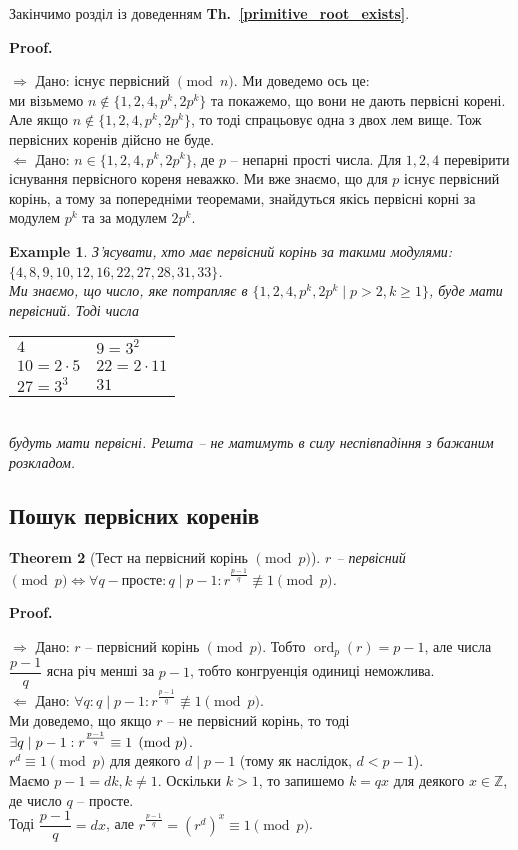 \documentclass[a4paper, 14pt]{extarticle}
\makeatletter
\theoremstyle{theoremdd}
\newtheorem{theorem}{Theorem}[subsection]
\theoremstyle{theoremdd}
\theoremstyle{theoremdd}
\theoremstyle{theoremdd}
\newtheorem{example}[theorem]{Example}
\theoremstyle{theoremdd}
\theoremstyle{theoremdd}
\theoremstyle{theoremdd}
\theoremstyle{theoremdd}
\def\qed{$\blacksquare$}
\def\rightproof{$\boxed{\Rightarrow}$ }
\def\leftproof{$\boxed{\Leftarrow}$ }
\renewenvironment{proof}[1][Proof.\\]{\par
\pushQED{\hfill \qed}%
\normalfont \topsep6\p@\@plus6\p@\relax
\trivlist
\item\relax
{\bfseries
#1\@addpunct{.}}\hspace\labelsep\ignorespaces
}{%
\popQED\endtrivlist\@endpefalse
}
\DeclareMathOperator{\ord}{ord}
\newcommand\thref[1]{\textbf{Th.~\ref{#1}}}
\makeatother
\begin{document}
Закінчимо розділ із доведенням \thref{primitive_root_exists}.

\begin{proof}
\rightproof Дано: існує первісний $\!\! \pmod n$. Ми доведемо ось це:\\
ми візьмемо $n \not\in \{1,2,4,p^k,2p^k\}$ та покажемо, що вони не дають первісні корені. Але якщо $n \not \in \{1,2,4,p^k,2p^k\}$, то тоді спрацьовує одна з двох лем вище. Тож первісних коренів дійсно не буде.
\bigskip \\
\leftproof Дано: $n \in \{1,2,4,p^k,2p^k\}$, де $p$ -- непарні прості числа. Для $1,2,4$ перевірити існування первісного кореня неважко. Ми вже знаємо, що для $p$ існує первісний корінь, а тому за попередніми теоремами, знайдуться якісь первісні корні за модулем $p^k$ та за модулем $2p^k$.
\end{proof}

\begin{example}
З'ясувати, хто має первісний корінь за такими модулями: $\{4,8,9,10,12,16,22,27,28,31,33\}$.\\
Ми знаємо, що число, яке потрапляє в $\{1,2,4,p^k,2p^k \mid p > 2, k \geq 1\}$, буде мати первісний. Тоді числа\\
\begin{tabular}{ll}
$4$ & $9 = 3^2$\\
$10 = 2 \cdot 5$ & $22 = 2 \cdot 11$\\
$27 = 3^3$ & $31$
\end{tabular}\\
будуть мати первісні. Решта -- не матимуть в силу неспівпадіння з бажаним розкладом.
\end{example}

\subsection{Пошук первісних коренів}
\begin{theorem}[Тест на первісний корінь $\!\! \pmod p$]
$r$ -- первісний $\pmod p \iff \forall q - \text{просте}: q \mid p-1: r^{\frac{p-1}{q}} \not\equiv 1 \pmod p$.
\end{theorem}

\begin{proof}
\rightproof Дано: $r$ -- первісний корінь $\pmod p$. Тобто $\ord_p (r) = p-1$, але числа $\dfrac{p-1}{q}$ ясна річ менші за $p-1$, тобто конгруенція одиниці неможлива.
\bigskip \\
\leftproof Дано: $\forall q: q \mid p-1: r^{\frac{p-1}{q}} \not\equiv 1 \pmod p$.\\
Ми доведемо, що якщо $r$ -- не первісний корінь, то тоді $\exists q \mid p-1:\\ r^{\frac{p-1}{q}} \equiv 1 \pmod p$.\\
$r^d \equiv 1 \pmod p$ для деякого $d \mid p-1$ (тому як наслідок, $d < p-1$).\\
Маємо $p-1 = dk, k \neq 1$. Оскільки $k>1$, то запишемо $k = qx$ для деякого $x \in \mathbb{Z}$, де число $q$ -- просте.\\
Тоді $\dfrac{p-1}{q} = dx$, але $r^{\frac{p-1}{q}} = (r^d)^x \equiv 1 \pmod p$.
\end{proof}
\end{document}
